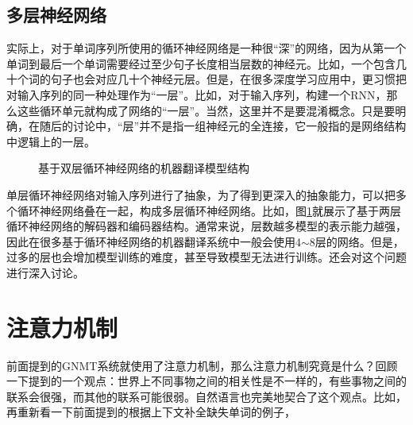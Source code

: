 
\subsection{多层神经网络}

\parinterval 实际上，对于单词序列所使用的循环神经网络是一种很“深”的网络，因为从第一个单词到最后一个单词需要经过至少句子长度相当层数的神经元。比如，一个包含几十个词的句子也会对应几十个神经元层。但是，在很多深度学习应用中，更习惯把对输入序列的同一种处理作为“一层”。比如，对于输入序列，构建一个RNN，那么这些循环单元就构成了网络的“一层”。当然，这里并不是要混淆概念。只是要明确，在随后的讨论中，“层”并不是指一组神经元的全连接，它一般指的是网络结构中逻辑上的一层。

\begin{figure}[htp]
\centering
 \hspace{10em}
\caption{基于双层循环神经网络的机器翻译模型结构}
\label{fig:10-15}
\end{figure}

\vspace{-0.5em}
\parinterval 单层循环神经网络对输入序列进行了抽象，为了得到更深入的抽象能力，可以把多个循环神经网络叠在一起，构成多层循环神经网络。比如，图\ref{fig:10-15}就展示了基于两层循环神经网络的解码器和编码器结构。通常来说，层数越多模型的表示能力越强，因此在很多基于循环神经网络的机器翻译系统中一般会使用4$\sim$8层的网络。但是，过多的层也会增加模型训练的难度，甚至导致模型无法进行训练。{\chapterthirteen}还会对这个问题进行深入讨论。

\sectionnewpage
\section{注意力机制}
\label{sec:10.4}

\parinterval 前面提到的GNMT系统就使用了注意力机制，那么注意力机制究竟是什么？回顾一下{\chaptertwo}提到的一个观点：世界上不同事物之间的相关性是不一样的，有些事物之间的联系会很强，而其他的联系可能很弱。自然语言也完美地契合了这个观点。比如，再重新看一下前面提到的根据上下文补全缺失单词的例子，

